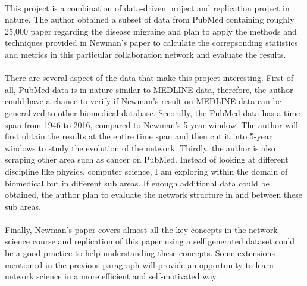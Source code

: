 \documentclass[12pt]{article}
\begin{document}
\paragraph{}
This project is a combination of data-driven project and replication project in nature. The author obtained a subset of data from PubMed containing roughly 25,000 paper regarding the disease migraine and plan to apply the methods and techniques provided in Newman's paper to calculate the correpsonding statistics and metrics in this particular collaboration network and evaluate the results. 
\paragraph{}
There are several aspect of the data that make this project interesting. First of all, PubMed data is in nature similar to MEDLINE data, therefore, the author could have a chance to verify if Newman's result on MEDLINE data can be generalized to other biomedical database. Secondly, the PubMed data has a time span from 1946 to 2016, compared to Newman's 5 year window. The author will first obtain the results at the entire time span and then cut it into 5-year windows to study the evolution of the network. Thirdly, the author is also scraping other area such as cancer on PubMed. Instead of looking at different discipline like physics, computer science, I am exploring within the domain of biomedical but in different sub areas. If enough additional data could be obtained, the author plan to evaluate the network structure in and between these sub areas. 
\paragraph{}
Finally, Newman's paper covers almost all the key concepts in the network science course and replication of this paper using a self generated dataset could be a good practice to help understanding these concepts. Some extensions mentioned in the previous paragraph will provide an opportunity to  learn network science in a more efficient and self-motivated way.
\end{document}

